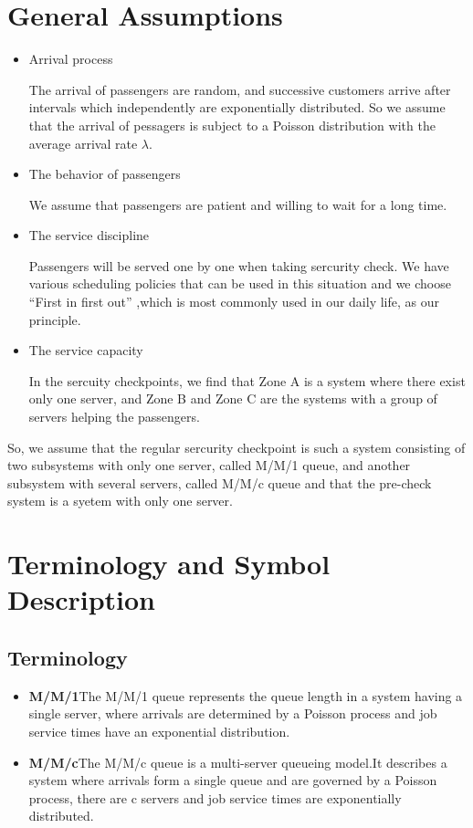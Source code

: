 \documentclass{mcmthesis}
\begin{document}
\section{General Assumptions}%

\begin{itemize}
			\item Arrival process
			
			 The arrival of passengers are random, and successive customers arrive after intervals which independently are exponentially distributed. So we assume that the arrival of pessagers is subject to a Poisson distribution with the average arrival rate ${\lambda}$.
			\item The behavior of passengers 
					
			 We assume that passengers are patient and willing to wait for a long time.
			\item The service discipline 
			
			 Passengers will be served one by one when taking sercurity check. We have various scheduling policies that can be used in this situation and we choose ``First in first out'' ,which is most commonly used in our daily life, as our principle.
			\item The service capacity 
			
			 In the sercuity checkpoints, we find that Zone A is a system where there exist only one server, and Zone B and Zone C are the systems with a group of servers helping the passengers.
\end{itemize}
		
	So, we assume that the regular sercurity checkpoint is such a system consisting of two subsystems with only one server, called M/M/1 queue, and another subsystem with several servers, called M/M/c queue and that the pre-check system is a syetem with only one server.

\section{Terminology and Symbol Description}%
\subsection{Terminology}
\begin{itemize}
	\item {\bf M/M/1}\qquad The M/M/1 queue represents the queue length in a system having a single server, where arrivals are determined by a Poisson process and job service times have an exponential distribution.
	\item {\bf M/M/c}\qquad The M/M/c queue is a multi-server queueing model.It describes a system where arrivals form a single queue and are governed by a Poisson process, there are c servers and job service times are exponentially distributed.
\end{itemize}
\end{document}
